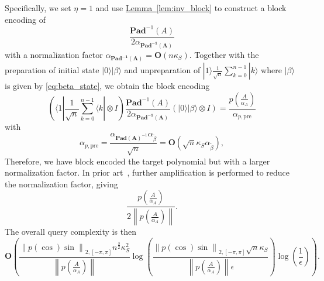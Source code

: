 \documentclass[letterpaper,onecolumn,11pt,accepted=2026-02-14]{quantumarticle}
\newcommand{\norm}[1]{\left\lVert#1\right\rVert}
\theoremstyle{remark}
\theoremstyle{plain}
\newcommand{\eq}[1]{\cref{eq:#1}}
\newcommand{\lem}[1]{\hyperref[lem:#1]{Lemma~\ref*{lem:#1}}}
\newcommand{\ket}[1]{|#1\rangle}
\newcommand{\bra}[1]{\langle#1|}
\begin{document}
Specifically, we set $\eta=1$ and use \lem{inv_block} to construct a block encoding of
    \begin{equation}
        \frac{\mathbf{Pad}^{-1}(A)}{2\alpha_{\scriptscriptstyle \mathbf{Pad^{-1}(A)}}}
    \end{equation}
with a normalization factor $\alpha_{\scriptscriptstyle \mathbf{Pad^{-1}(A)}}=\mathbf{O}\left(n\kappa_S\right)$. 
Together with the preparation of initial state $\ket{0}\ket{\beta}$ and unpreparation of $\ket{1}\frac{1}{\sqrt{n}}\sum_{k=0}^{n-1}\ket{k}$ where $\ket{\beta}$ is given by \eq{beta_state}, we obtain the block encoding
    \begin{equation}
        \left(\bra{1}\frac{1}{\sqrt{n}}\sum_{k=0}^{n-1}\bra{k}\otimes I\right)
        \frac{\mathbf{Pad}^{-1}(A)}{2\alpha_{\scriptscriptstyle \mathbf{Pad^{-1}(A)}}}
        \left(\ket{0}\ket{\beta}\otimes I\right)
        =\frac{p\left(\frac{A}{\alpha_A}\right)}{\alpha_{p,\text{pre}}}
    \end{equation}
    with
    \begin{equation}
        \alpha_{p,\text{pre}}=\frac{\alpha_{\scriptscriptstyle \mathbf{Pad(A)}^{-1}}\alpha_{\widetilde\beta}}{\sqrt{n}}
        =\mathbf{O}\left(\sqrt{n}\kappa_S \alpha_{\widetilde\beta}\right),
    \end{equation}
Therefore, we have block encoded the target polynomial but with a larger normalization factor. In prior art~\cite[Theorem 5]{QEVP}, further amplification is performed to reduce the normalization factor, giving
    \begin{equation}
        \frac{p\left(\frac{A}{\alpha_A}\right)}{2\norm{p\left(\frac{A}{\alpha_A}\right)}}.
    \end{equation}
The overall query complexity is then
    \begin{equation}
        \mathbf{O}\left(\frac{\norm{p(\cos)\sin}_{2,[-\pi,\pi]}n^{\frac{3}{2}}\kappa_S^2}{\norm{p\left(\frac{A}{\alpha_A}\right)}}\log\left(\frac{\norm{p(\cos)\sin}_{2,[-\pi,\pi]}\sqrt{n}\kappa_S}{\norm{p\left(\frac{A}{\alpha_A}\right)}\epsilon}\right)\log\left(\frac{1}{\epsilon}\right)\right).
    \end{equation}
\end{document}
